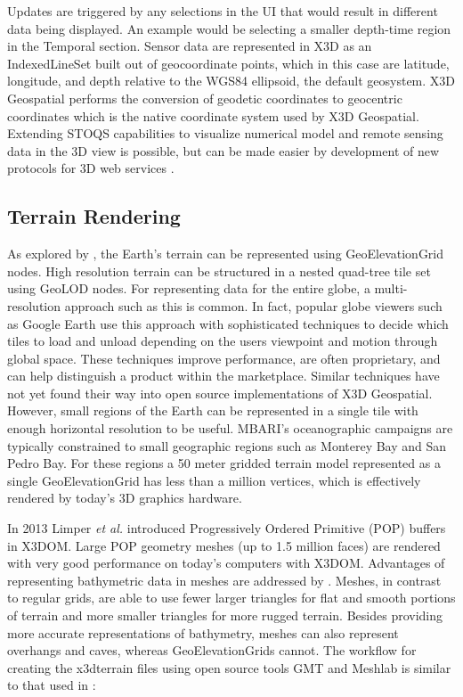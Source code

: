 \documentclass[conference]{IEEEtran}
\begin{document}
Updates are triggered by any selections in the UI that would result in different data being displayed. An example would be selecting a smaller depth-time region in the Temporal section. Sensor data are represented in X3D as an IndexedLineSet built out of geocoordinate points, which in this case are latitude, longitude, and depth relative to the WGS84 ellipsoid, the default geosystem. X3D Geospatial performs the conversion of geodetic coordinates to geocentric coordinates which is the native coordinate system used by X3D Geospatial. Extending STOQS capabilities to visualize numerical model and remote sensing data in the 3D view is possible, but can be made easier by development of new protocols for 3D web services \cite{McCann:2014:IXG:2628588.2628609}.

\subsection{Terrain Rendering}

As explored by \cite{yoo09}, the Earth's terrain can be represented using GeoElevationGrid nodes. High resolution terrain can be structured in a nested quad-tree tile set using GeoLOD nodes. For representing data for the entire globe, a multi-resolution approach such as this is common. In fact, popular globe viewers such as Google Earth use this approach with sophisticated techniques to decide which tiles to load and unload depending on the users viewpoint and motion through global space. These techniques improve performance, are often proprietary, and can help distinguish a product within the marketplace. Similar techniques have not yet found their way into open source implementations of X3D Geospatial. However, small regions of the Earth can be represented in a single tile with enough horizontal resolution to be useful. MBARI's oceanographic campaigns are typically constrained to small geographic regions such as Monterey Bay and San Pedro Bay. For these regions a 50 meter gridded terrain model represented as a single GeoElevationGrid has less than a million vertices, which is effectively  rendered by today's 3D graphics hardware.

In 2013 Limper \textit{et al.} \cite{Limper:2013:FDW:2466533.2466536} introduced Progressively Ordered Primitive (POP) buffers in X3DOM. Large POP geometry meshes (up to 1.5 million faces) are rendered with very good performance on today's computers with X3DOM. Advantages of representing bathymetric data in meshes are addressed by \cite{Becker:2005:NPN:1650409.1650513}. Meshes, in contrast to regular grids, are able to use fewer larger triangles for flat and smooth portions of terrain and more smaller triangles for more rugged terrain. Besides providing more accurate representations of bathymetry, meshes can also represent overhangs and caves, whereas GeoElevationGrids cannot. The workflow for creating the x3dterrain files using open source tools GMT \cite{GMT} and Meshlab \cite{Meshlab} is similar to that used in \cite{Silvestre}:
\end{document}
